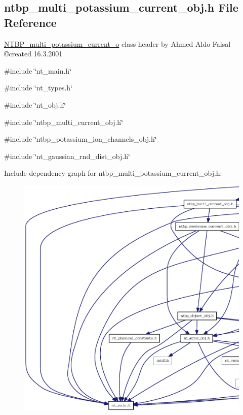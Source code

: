 \subsection{ntbp\_\-multi\_\-potassium\_\-current\_\-obj.h File Reference}
\label{ntbp__multi__potassium__current__obj_8h}



\begin{DoxyItemize}
\item \hyperlink{class_n_t_b_p__multi__potassium__current__o}{NTBP\_\-multi\_\-potassium\_\-current\_\-o} class header by Ahmed Aldo Faisal \copyright created 16.3.2001 
\end{DoxyItemize} 


{\ttfamily \#include \char`\"{}nt\_\-main.h\char`\"{}}\par
{\ttfamily \#include \char`\"{}nt\_\-types.h\char`\"{}}\par
{\ttfamily \#include \char`\"{}nt\_\-obj.h\char`\"{}}\par
{\ttfamily \#include \char`\"{}ntbp\_\-multi\_\-current\_\-obj.h\char`\"{}}\par
{\ttfamily \#include \char`\"{}ntbp\_\-potassium\_\-ion\_\-channels\_\-obj.h\char`\"{}}\par
{\ttfamily \#include \char`\"{}nt\_\-gaussian\_\-rnd\_\-dist\_\-obj.h\char`\"{}}\par
Include dependency graph for ntbp\_\-multi\_\-potassium\_\-current\_\-obj.h:
\nopagebreak
\begin{figure}[H]
\begin{center}
\leavevmode
\includegraphics[width=400pt]{ntbp__multi__potassium__current__obj_8h__incl}
\end{center}
\end{figure}
